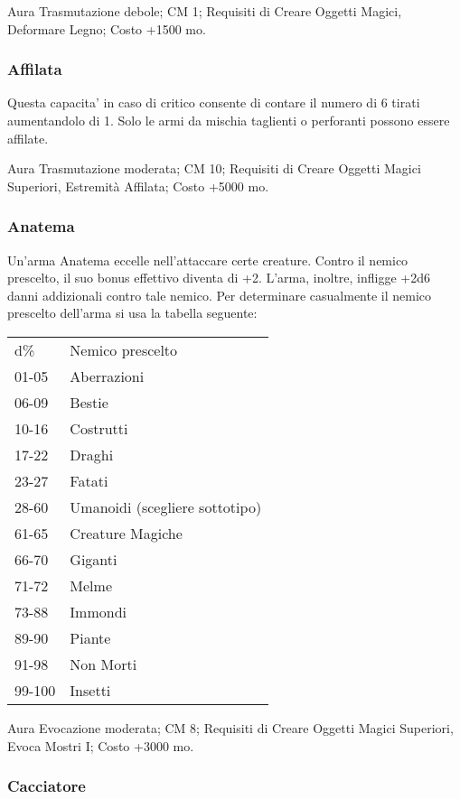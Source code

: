 \begin{multicols}{2}
Aura Trasmutazione debole; CM 1; Requisiti di Creare Oggetti Magici, Deformare Legno; Costo +1500 mo.

\subsubsection{Affilata}

Questa capacita' in caso di critico consente di contare il numero di 6 tirati aumentandolo di 1.
Solo le armi da mischia taglienti o perforanti possono essere affilate.

Aura Trasmutazione moderata; CM 10; Requisiti di Creare Oggetti Magici Superiori, Estremità Affilata; Costo +5000 mo.

\subsubsection{Anatema}

Un'arma Anatema eccelle nell'attaccare certe creature. Contro il nemico prescelto, il suo bonus effettivo diventa di +2. L'arma, inoltre, infligge +2d6 danni addizionali contro tale nemico. Per determinare casualmente il nemico prescelto dell'arma si usa la tabella seguente:

\medskip

\begin{tabular}{ll}
d\% 	&Nemico prescelto\\
01-05 	&Aberrazioni\\
06-09 	&Bestie\\
10-16 	&Costrutti\\
17-22 	&Draghi\\
23-27 	&Fatati\\
28-60 	&Umanoidi (scegliere sottotipo)\\
61-65 	&Creature Magiche\\
66-70 	&Giganti\\
71-72 	&Melme\\
73-88 	&Immondi\\
89-90 	&Piante\\
91-98 	&Non Morti\\
99-100 	&Insetti\\
\end{tabular}

\medskip

Aura Evocazione moderata; CM 8; Requisiti di Creare Oggetti Magici Superiori, Evoca Mostri I; Costo +3000 mo.

\subsubsection{Cacciatore}


\end{multicols}
